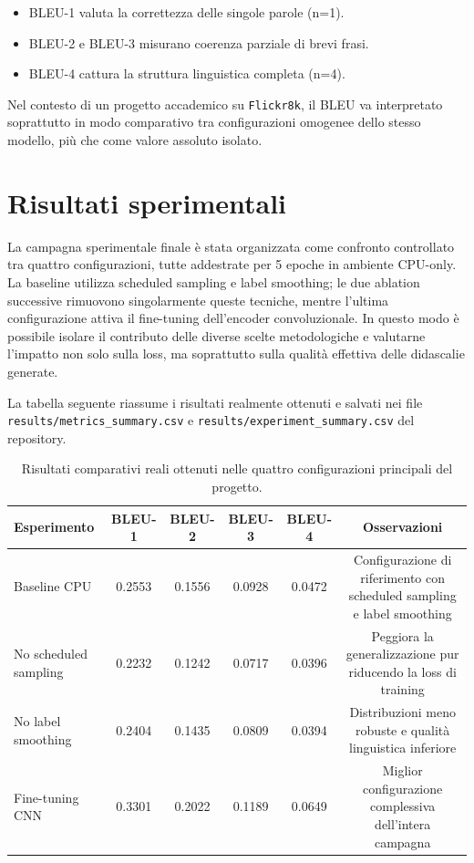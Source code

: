 \documentclass[11pt,a4paper]{report}
\newcommand{\dataset}{\texttt{Flickr8k}}
\begin{document}
\begin{tcolorbox}[title=Interpretazione del BLEU]
\begin{itemize}
  \item BLEU-1 valuta la correttezza delle singole parole (n=1).
  \item BLEU-2 e BLEU-3 misurano coerenza parziale di brevi frasi.
  \item BLEU-4 cattura la struttura linguistica completa (n=4).
\end{itemize}
Nel contesto di un progetto accademico su \dataset{}, il BLEU va interpretato soprattutto in modo comparativo tra configurazioni omogenee dello stesso modello, più che come valore assoluto isolato.
\end{tcolorbox}

\section{Risultati sperimentali}

La campagna sperimentale finale è stata organizzata come confronto controllato tra quattro configurazioni, tutte addestrate per 5 epoche in ambiente CPU-only. La baseline utilizza scheduled sampling e label smoothing; le due ablation successive rimuovono singolarmente queste tecniche, mentre l’ultima configurazione attiva il fine-tuning dell’encoder convoluzionale. In questo modo è possibile isolare il contributo delle diverse scelte metodologiche e valutarne l’impatto non solo sulla loss, ma soprattutto sulla qualità effettiva delle didascalie generate.

La tabella seguente riassume i risultati realmente ottenuti e salvati nei file \texttt{results/metrics\_summary.csv} e \texttt{results/experiment\_summary.csv} del repository.

\begin{table}[H]
\centering
\begin{tabular}{lccccc}
\toprule
\textbf{Esperimento} & \textbf{BLEU-1} & \textbf{BLEU-2} & \textbf{BLEU-3} & \textbf{BLEU-4} & \textbf{Osservazioni} \\
\midrule
Baseline CPU & 0.2553 & 0.1556 & 0.0928 & 0.0472 & Configurazione di riferimento con scheduled sampling e label smoothing \\
No scheduled sampling & 0.2232 & 0.1242 & 0.0717 & 0.0396 & Peggiora la generalizzazione pur riducendo la loss di training \\
No label smoothing & 0.2404 & 0.1435 & 0.0809 & 0.0394 & Distribuzioni meno robuste e qualità linguistica inferiore \\
Fine-tuning CNN & 0.3301 & 0.2022 & 0.1189 & 0.0649 & Miglior configurazione complessiva dell'intera campagna \\
\bottomrule
\end{tabular}
\caption{Risultati comparativi reali ottenuti nelle quattro configurazioni principali del progetto.}
\end{table}
\end{document}
